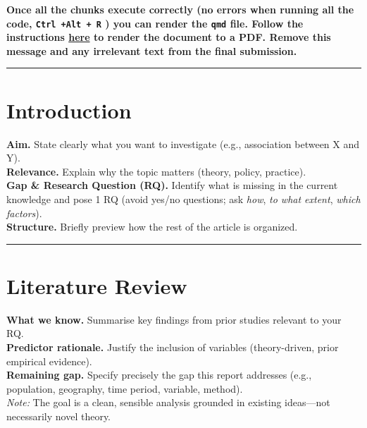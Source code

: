 \documentclass[
  letterpaper,
  DIV=11,
  numbers=noendperiod]{scrreprt}
\begin{document}
\textbf{Once all the chunks execute correctly (no errors when running
all the code, \texttt{Ctrl\ +Alt\ +\ R} ) you can render the
\texttt{qmd} file. Follow the instructions
\href{https://gdsl-ul.github.io/stats/general/howSubmit.html}{here} to
render the document to a PDF. Remove this message and any irrelevant
text from the final submission.}

\begin{center}\rule{0.5\linewidth}{0.5pt}\end{center}

\section*{Introduction}\label{introduction}


\textbf{Aim.} State clearly what you want to investigate (e.g.,
association between X and Y).\\
\textbf{Relevance.} Explain why the topic matters (theory, policy,
practice).\\
\textbf{Gap \& Research Question (RQ).} Identify what is missing in the
current knowledge and pose 1 RQ (avoid yes/no questions; ask \emph{how},
\emph{to what extent}, \emph{which factors}).\\
\textbf{Structure.} Briefly preview how the rest of the article is
organized.

\begin{center}\rule{0.5\linewidth}{0.5pt}\end{center}

\section*{Literature Review}\label{literature-review}


\textbf{What we know.} Summarise key findings from prior studies
relevant to your RQ.\\
\textbf{Predictor rationale.} Justify the inclusion of variables
(theory-driven, prior empirical evidence).\\
\textbf{Remaining gap.} Specify precisely the gap this report addresses
(e.g., population, geography, time period, variable, method).\\
\emph{Note:} The goal is a clean, sensible analysis grounded in existing
ideas---not necessarily novel theory.
\end{document}
